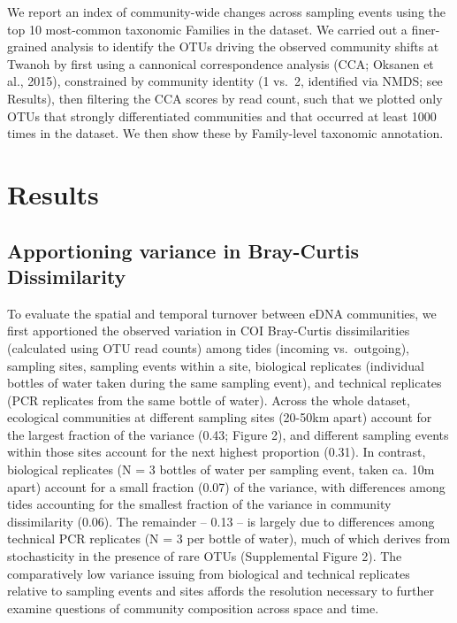 \documentclass[fleqn,10pt,lineno]{wlpeerj} %
\begin{document}
We report an index of community-wide changes across sampling events
using the top 10 most-common taxonomic Families in the dataset. We
carried out a finer-grained analysis to identify the OTUs driving the
observed community shifts at Twanoh by first using a cannonical
correspondence analysis (CCA; Oksanen et al., 2015), constrained by
community identity (1 vs.~2, identified via NMDS; see Results), then
filtering the CCA scores by read count, such that we plotted only OTUs
that strongly differentiated communities and that occurred at least 1000
times in the dataset. We then show these by Family-level taxonomic
annotation.

\section{Results}\label{results}

\subsection{Apportioning variance in Bray-Curtis
Dissimilarity}\label{apportioning-variance-in-bray-curtis-dissimilarity}

To evaluate the spatial and temporal turnover between eDNA communities,
we first apportioned the observed variation in COI Bray-Curtis
dissimilarities (calculated using OTU read counts) among tides (incoming
vs.~outgoing), sampling sites, sampling events within a site, biological
replicates (individual bottles of water taken during the same sampling
event), and technical replicates (PCR replicates from the same bottle of
water). Across the whole dataset, ecological communities at different
sampling sites (20-50km apart) account for the largest fraction of the
variance (0.43; Figure 2), and different sampling events within those
sites account for the next highest proportion (0.31). In contrast,
biological replicates (N = 3 bottles of water per sampling event, taken
ca. 10m apart) account for a small fraction (0.07) of the variance, with
differences among tides accounting for the smallest fraction of the
variance in community dissimilarity (0.06). The remainder -- 0.13 -- is
largely due to differences among technical PCR replicates (N = 3 per
bottle of water), much of which derives from stochasticity in the
presence of rare OTUs (Supplemental Figure 2). The comparatively low
variance issuing from biological and technical replicates relative to
sampling events and sites affords the resolution necessary to further
examine questions of community composition across space and time.
\end{document}
